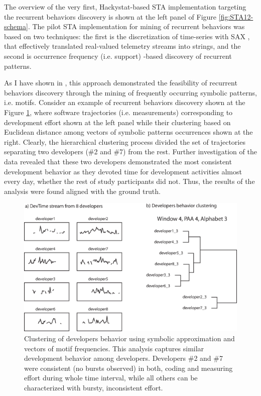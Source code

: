 The overview of the very first, Hackystat-based STA implementation targeting the recurrent behaviors 
discovery is shown at the left panel of Figure  \ref{fig:STA12-schema}.
The pilot STA implementation for mining of recurrent behaviors was based on two techniques: the first is the 
discretization of time-series with SAX \cite{sax}, that effectively translated real-valued telemetry streams 
into strings, and the second is occurrence frequency (i.e. support) -based discovery of recurrent patterns.

As I have shown in \cite{csdl2-10-09}, this approach demonstrated the feasibility of recurrent behaviors discovery 
through the mining of frequently occurring symbolic patterns, i.e. motifs. 
Consider an example of recurrent behaviors discovery shown at the Figure \ref{fig:STA1-results}, where software 
trajectories (i.e. measurements) corresponding to development effort shown at the left panel while their clustering based on Euclidean 
distance among vectors of symbolic patterns occurrences shown at the right. Clearly, the hierarchical clustering 
process divided the set of trajectories separating two developers (\#2 and \#7) from the rest. 
Further investigation of the data revealed that these two developers demonstrated the most consistent development 
behavior as they devoted time for development activities almost every day, whether the rest of study participants 
did not. Thus, the results of the analysis were found aligned with the ground truth.

\begin{figure}[t]
   \centering
   \includegraphics[width=145mm]{figures/STA1.eps}
   \caption{Clustering of developers behavior using symbolic approximation and vectors of motif frequencies. 
   This analysis captures similar development behavior among developers. 
   Developers \#2 and \#7 were consistent (no bursts observed) in both, coding and measuring effort during whole time interval, 
   while all others can be characterized with bursty, inconsistent effort.}
   \label{fig:STA1-results}
\end{figure}

